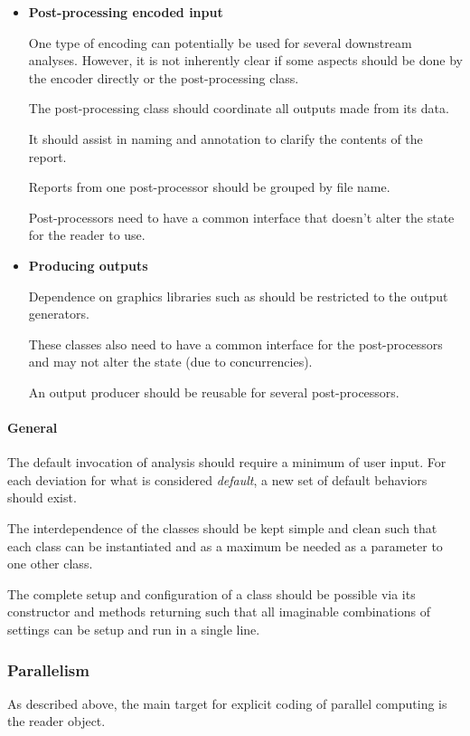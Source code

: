 \documentclass[letterpaper,10pt,english]{sphinxmanual}
\begin{document}
\begin{itemize}
\item {} 
\textbf{Post-processing encoded input}

One type of encoding can potentially be used for several downstream analyses.
However, it is not inherently clear if some aspects should be done by the
encoder directly or the post-processing class.

The post-processing class should coordinate all outputs made from its data.

It should assist in naming and annotation to clarify the contents of the
report.

Reports from one post-processor should be grouped by file name.

Post-processors need to have a common interface that doesn't alter the state
for the reader to use.

\item {} 
\textbf{Producing outputs}

Dependence on graphics libraries such as  should be restricted
to the output generators.

These classes also need to have a common interface for the post-processors
and may not alter the state (due to concurrencies).

An output producer should be reusable for several post-processors.

\end{itemize}


\paragraph{General}
\label{c3se_python_course:general}
The default invocation of analysis should require a minimum of user input.
For each deviation for what is considered \emph{default}, a new set of default
behaviors should exist.

The interdependence of the classes should be kept simple and clean such that
each class can be instantiated and as a maximum be needed as a parameter to
one other class.

The complete setup and configuration of a class should be possible via its
constructor and methods returning  such that all imaginable
combinations of settings can be setup and run in a single line.


\subsubsection{Parallelism}
\label{c3se_python_course:parallelism}
As described above, the main target for explicit coding of parallel computing
is the reader object.
\end{document}
